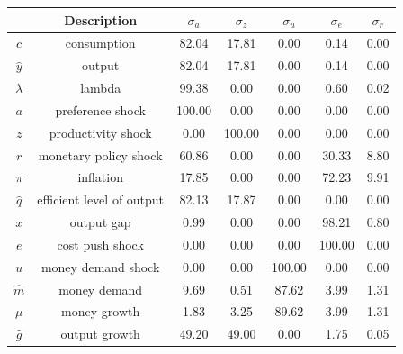 \documentclass[11pt,preprint, authoryear]{elsarticle}
\let\origtable\table
\let\endorigtable\endtable
\renewenvironment{table}[1][2] {
    \expandafter\origtable\expandafter[H]
} {
    \endorigtable
}
\numberwithin{equation}{section}
\numberwithin{figure}{section}
\numberwithin{table}{section}
\begin{document}
\begin{table}
\caption{Taylor Rule: Posterior Mean Variance Decomposition (in percent)}
 \begin{center}
\begin{tabular}{|c|c|c|c|c|c|c|}
\hline
  & Description &   ${\sigma_a}$  &  ${\sigma_z}$ & ${\sigma_u}$ & ${\sigma_e}$ & ${\sigma_r}$\\
\hline
${c}$ & consumption & 82.04 & 17.81 & 0.00 & 0.14 & 0.00 \\
 ${\hat y}$  & output & 82.04 & 17.81 & 0.00 & 0.14 & 0.00 \\
 ${\lambda}$ & lambda & 99.38 & 0.00 & 0.00 & 0.60 & 0.02 \\
${a}$ & preference shock & 100.00 & 0.00 & 0.00 & 0.00 & 0.00 \\
${z}$ & productivity shock & 0.00 & 100.00 & 0.00 & 0.00 & 0.00 \\
 ${r}$ & monetary policy shock & 60.86 & 0.00 & 0.00 & 30.33 & 8.80 \\
${\pi}$ & inflation & 17.85 & 0.00 & 0.00 & 72.23 & 9.91 \\
${\hat q}$ & efficient level of output & 82.13 & 17.87 & 0.00 & 0.00 & 0.00 \\
 ${x}$ & output gap & 0.99 & 0.00 & 0.00 & 98.21 & 0.80 \\
${e}$ & cost push shock & 0.00 & 0.00 & 0.00 & 100.00 & 0.00 \\
${u}$ & money demand shock & 0.00 & 0.00 & 100.00 & 0.00 & 0.00 \\
${\hat m}$ & money demand & 9.69 & 0.51 & 87.62 & 3.99 & 1.31\\
${\mu}$  & money growth & 1.83 & 3.25 & 89.62 & 3.99 & 1.31 \\
${\hat g}$ & output growth & 49.20 & 49.00 & 0.00 & 1.75 & 0.05\\
\hline
\end{tabular}
\end{center}
\label{tay_var_dec}
\end{table}
\end{document}
